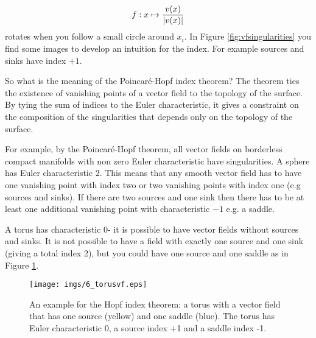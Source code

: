 \[f: x \mapsto \frac{v(x)}{\left| v(x) \right|}\] 
rotates when you follow a small circle around $x_i$.
In Figure \ref{fig:vfsingularities} you find some images to develop an intuition for the index. For example sources and sinks have index $+1$.


So what is the meaning of the Poincar\'e-Hopf index theorem? 
The theorem ties the existence of vanishing points of a vector field to the topology of the surface. By tying the sum of indices to the Euler characteristic, it gives a constraint on the composition of the singularities that depends only on the topology of the surface.

For example, by the Poincar\'e-Hopf theorem, all vector fields on borderless compact manifolds with non zero Euler characteristic have singularities. A sphere has Euler characteristic $2$. This means that any smooth vector field has to have one vanishing point with index two or two vanishing points with index one (e.g sources and sinks). If there are two sources and one sink then there has to be at least one additional vanishing point with characteristic $-1$ e.g. a saddle. 

A torus has characteristic $0$- it is possible to have vector fields without sources and sinks. It is not possible to have a field with exactly one source and one sink (giving a total index 2), but you could have one source and one saddle as in Figure \ref{fig:torusvf}. 

\begin{figure}%
\texttt{[image: imgs/6\_torusvf.eps]}%
\caption{An example for the Hopf index theorem: a torus with a vector field that has one source (yellow) and one saddle (blue). The torus has Euler characteristic 0, a source index +1 and a saddle index -1.}%
\label{fig:torusvf}%
\end{figure}

